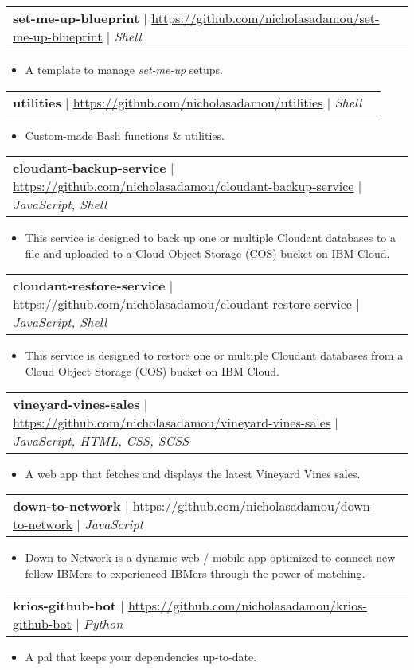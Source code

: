 \documentclass[letterpaper,11pt]{article}
\makeatletter
\newcommand{\resumeItemBulletless}[1]{
  \item[] \small{
    {#1 \vspace{-2pt}}
  }
}
\newcommand{\resumeProjectHeading}[2]{
    \item
    \begin{tabular*}{0.97\textwidth}{l@{\extracolsep{\fill}}r}
      \small#1 & #2 \\
    \end{tabular*}\vspace{-7pt}
}
\newcommand{\resumeItemListStart}{\begin{itemize}[rightmargin=\dimexpr\linewidth-17.25cm-\leftmargin\relax]}
\newcommand{\resumeItemListEnd}{\end{itemize}\vspace{-5pt}}
\makeatother
\begin{document}
\resumeProjectHeading
{\textbf{set-me-up-blueprint} $|$ \href{https://github.com/nicholasadamou/set-me-up-blueprint}{\underline{https://github.com/nicholasadamou/set-me-up-blueprint}} $|$ \emph{Shell}}{}
\resumeItemListStart
\resumeItemBulletless{A template to manage \emph{set-me-up} setups.}
\resumeItemListEnd

\resumeProjectHeading
{\textbf{utilities} $|$ \href{https://github.com/nicholasadamou/utilities}{\underline{https://github.com/nicholasadamou/utilities}} $|$ \emph{Shell}}{}
\resumeItemListStart
\resumeItemBulletless{Custom-made Bash functions \& utilities.}
\resumeItemListEnd

\resumeProjectHeading
{\textbf{cloudant-backup-service} $|$ \href{https://github.com/nicholasadamou/cloudant-backup-service}{\underline{https://github.com/nicholasadamou/cloudant-backup-service}} $|$ \emph{JavaScript, Shell}}{}
\resumeItemListStart
\resumeItemBulletless{This service is designed to back up one or multiple Cloudant databases to a file and uploaded to a Cloud Object Storage (COS) bucket on IBM Cloud.}
\resumeItemListEnd

\resumeProjectHeading
{\textbf{cloudant-restore-service} $|$ \href{https://github.com/nicholasadamou/cloudant-restore-service}{\underline{https://github.com/nicholasadamou/cloudant-restore-service}} $|$ \emph{JavaScript, Shell}}{}
\resumeItemListStart
\resumeItemBulletless{This service is designed to restore one or multiple Cloudant databases from a Cloud Object Storage (COS) bucket on IBM Cloud.}
\resumeItemListEnd

\resumeProjectHeading
{\textbf{vineyard-vines-sales} $|$ \href{https://github.com/nicholasadamou/vineyard-vines-sales}{\underline{https://github.com/nicholasadamou/vineyard-vines-sales}} $|$ \emph{JavaScript, HTML, CSS, SCSS}}{}
\resumeItemListStart
\resumeItemBulletless{A web app that fetches and displays the latest Vineyard Vines sales.}
\resumeItemListEnd

\resumeProjectHeading
{\textbf{down-to-network} $|$ \href{https://github.com/nicholasadamou/down-to-network}{\underline{https://github.com/nicholasadamou/down-to-network}} $|$ \emph{JavaScript}}{}
\resumeItemListStart
\resumeItemBulletless{Down to Network is a dynamic web / mobile app optimized to connect new fellow IBMers to experienced IBMers through the power of matching.}
\resumeItemListEnd

\resumeProjectHeading
{\textbf{krios-github-bot} $|$ \href{https://github.com/nicholasadamou/krios-github-bot}{\underline{https://github.com/nicholasadamou/krios-github-bot}} $|$ \emph{Python}}{}
\resumeItemListStart
\resumeItemBulletless{A pal that keeps your dependencies up-to-date.}
\resumeItemListEnd
\end{document}
